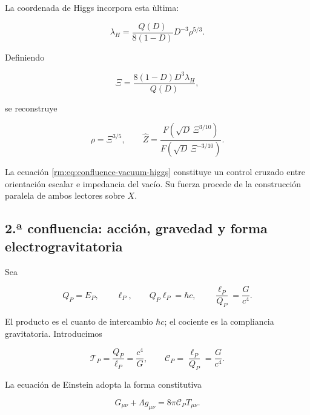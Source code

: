 La coordenada de Higgs incorpora esta \`ultima:

\begin{equation}
 \lambda_H=\frac{Q(D)}{8(1-D)}D^{-3}\rho^{5/3}.
 \label{rm:eq:confluence-higgs}
\end{equation}

Definiendo

\begin{equation}
 \Xi=\frac{8(1-D)D^3\lambda_H}{Q(D)},
 \label{rm:eq:confluence-xi}
\end{equation}

se reconstruye

\begin{equation}
 \rho=\Xi^{3/5},
 \qquad
 \widehat Z=
 \frac{F(\sqrt D\,\Xi^{3/10})}
      {F(\sqrt D\,\Xi^{-3/10})}.
 \label{rm:eq:confluence-vacuum-higgs}
\end{equation}

La ecuaci\'on \cref{rm:eq:confluence-vacuum-higgs} constituye un control cruzado
entre orientaci\'on escalar e impedancia del vac\'io.  Su fuerza procede de la
construcci\'on paralela de ambos lectores sobre \(X\).

\subsection{2.ª confluencia: acción, gravedad y forma electrogravitatoria}

Sea

\begin{equation}
 Q_P=E_P,
 \qquad
 \ell_P,
 \qquad
 Q_P\ell_P=\hbar c,
 \qquad
 \frac{\ell_P}{Q_P}=\frac{G}{c^4}.
 \label{rm:eq:confluence-planck-pair}
\end{equation}

El producto es el cuanto de intercambio \(\hbar c\); el cociente es la
compliancia gravitatoria.  Introducimos

\begin{equation}
 \mathscr T_P=\frac{Q_P}{\ell_P}=\frac{c^4}{G},
 \qquad
 \mathscr C_P=\frac{\ell_P}{Q_P}=\frac{G}{c^4}.
 \label{rm:eq:confluence-tension-compliance}
\end{equation}

La ecuaci\'on de Einstein adopta la forma constitutiva

\begin{equation}
 G_{\mu\nu}+\Lambda g_{\mu\nu}
 =8\pi\mathscr C_P T_{\mu\nu}.
 \label{rm:eq:confluence-einstein-constitutive}
\end{equation}

